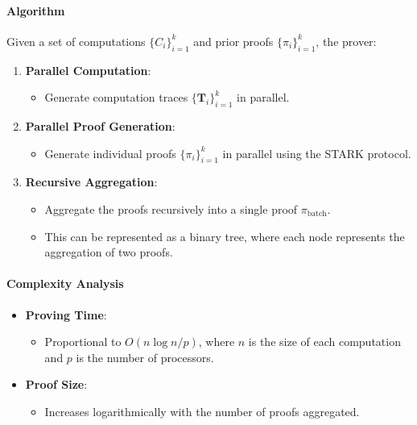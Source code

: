 \documentclass{article}
\theoremstyle{plain}
\theoremstyle{definition}
\theoremstyle{remark}
\theoremstyle{problem}
\begin{document}
\paragraph{Algorithm}

Given a set of computations $\{C_i\}_{i=1}^k$ and prior proofs $\{\pi_i\}_{i=1}^k$, the prover:

\begin{enumerate}
    \item \textbf{Parallel Computation}:

    \begin{itemize}
        \item Generate computation traces $\{\mathbf{T}_i\}_{i=1}^k$ in parallel.
    \end{itemize}

    \item \textbf{Parallel Proof Generation}:

    \begin{itemize}
        \item Generate individual proofs $\{\pi_i\}_{i=1}^k$ in parallel using the STARK protocol.
    \end{itemize}

    \item \textbf{Recursive Aggregation}:

    \begin{itemize}
        \item Aggregate the proofs recursively into a single proof $\pi_{\text{batch}}$.
        \item This can be represented as a binary tree, where each node represents the aggregation of two proofs.
    \end{itemize}
\end{enumerate}

\paragraph{Complexity Analysis}

\begin{itemize}
    \item \textbf{Proving Time}:

    \begin{itemize}
        \item Proportional to $O(n \log n / p)$, where $n$ is the size of each computation and $p$ is the number of processors.
    \end{itemize}

    \item \textbf{Proof Size}:

    \begin{itemize}
        \item Increases logarithmically with the number of proofs aggregated.
    \end{itemize}
\end{itemize}
\end{document}
